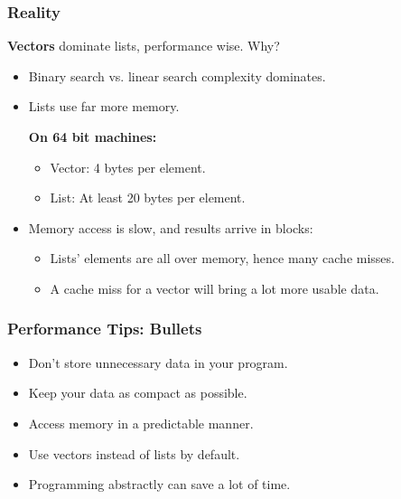 \begin{frame}
  \frametitle{Reality}
 

  
  {\bf Vectors} dominate lists, performance wise. Why?
  \vfill
  \begin{itemize}
    \item Binary search vs. linear search complexity dominates.
    \vfill
    \item Lists use far more memory.

      {\bf On 64 bit machines:}
      \begin{itemize}
        \item Vector: 4 bytes per element.
        \item List: At least 20 bytes per element.
      \end{itemize}
    \vfill
    \item Memory access is slow, and results arrive in blocks:
      \begin{itemize}
        \item Lists' elements are all over memory, hence many
          cache misses.
        \item A cache miss for a vector will bring a lot more usable data.
      \end{itemize}
  \end{itemize}
  
\end{frame}

\begin{frame}
  \frametitle{Performance Tips: Bullets}

  
  \begin{itemize}
    \item Don't store unnecessary data in your program.
    \vfill
    \item Keep your data as compact as possible.
    \vfill
    \item Access memory in a predictable manner.
    \vfill
    \item Use vectors instead of lists by default.
    \vfill
    \item Programming abstractly can save a lot of time.
  \end{itemize}
  
\end{frame}






